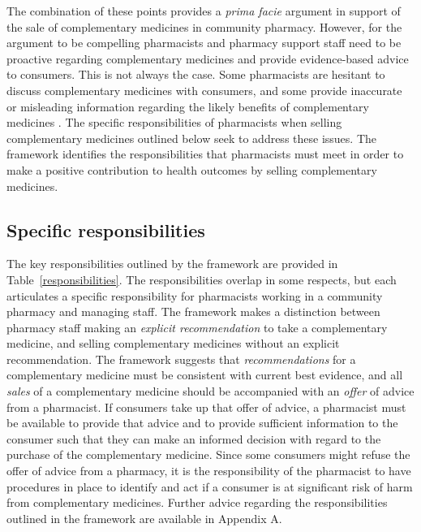 \documentclass[11pt,a4paper]{article}
\begin{document}
The combination of these points provides a \emph{prima facie} argument
in support of the sale of complementary medicines in community pharmacy.
However, for the argument to be compelling pharmacists and pharmacy
support staff need to be proactive regarding complementary medicines and
provide evidence-based advice to consumers. This is not always the case.
Some pharmacists are hesitant to discuss complementary medicines with
consumers, and some provide inaccurate or misleading information
regarding the likely benefits of complementary medicines
\autocites{SalmanPopattia2018}{Arnold2016}{Bray2017}. The specific
responsibilities of pharmacists when selling complementary medicines
outlined below seek to address these issues. The framework identifies
the responsibilities that pharmacists must meet in order to make a
positive contribution to health outcomes by selling complementary
medicines.

\subsection{Specific responsibilities}\label{specific-responsibilities}

The key responsibilities outlined by the framework are provided in
Table~\ref{responsibilities}. The responsibilities overlap in some
respects, but each articulates a specific responsibility for pharmacists
working in a community pharmacy and managing staff. The framework makes
a distinction between pharmacy staff making an \emph{explicit
recommendation} to take a complementary medicine, and selling
complementary medicines without an explicit recommendation. The
framework suggests that \emph{recommendations} for a complementary
medicine must be consistent with current best evidence, and all
\emph{sales} of a complementary medicine should be accompanied with an
\emph{offer} of advice from a pharmacist. If consumers take up that
offer of advice, a pharmacist must be available to provide that advice
and to provide sufficient information to the consumer such that they can
make an informed decision with regard to the purchase of the
complementary medicine. Since some consumers might refuse the offer of
advice from a pharmacy, it is the responsibility of the pharmacist to
have procedures in place to identify and act if a consumer is at
significant risk of harm from complementary medicines. Further advice
regarding the responsibilities outlined in the framework are available
in Appendix A.


\end{document}
